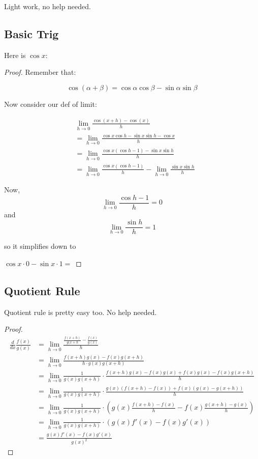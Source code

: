 Light work, no help needed.

\subsection{Basic Trig}

Here is $\cos x$:
\begin{proof}
Remember that:

\[\cos(\alpha + \beta) = \cos\alpha\cos\beta - \sin\alpha\sin\beta\]

Now consider our def of limit:

\begin{align}
&\lim_{h \to 0} \frac{\cos(x + h) - \cos(x)}{h} \\
&= \lim_{h \to 0} \frac{\cos x \cos h - \sin x \sin h - \cos x}{h} \\
&= \lim_{h \to 0} \frac{\cos x(\cos h - 1) - \sin x \sin h}{h} \\ 
&= \lim_{h \to 0} \frac{\cos x(\cos h - 1)}{h} - \lim_{h \to 0} \frac{\sin x \sin h}{h}
\end{align}

Now, 
\[\lim_{h \to 0} \frac{\cos h - 1}{h} = 0\]
and
\[\lim_{h \to 0} \frac{\sin h}{h} = 1\]

so it simplifies down to

$\cos x \cdot 0 - \sin x \cdot 1 =$ 
\end{proof}

\subsection{Quotient Rule}


Quotient rule is pretty easy too. No help needed.
\begin{proof}
\begin{align}
\frac{d}{dx} \frac{f(x)}{g(x)}
&= \lim_{h \to 0} \frac{\frac{f(x + h)}{g(x + h} - \frac{f(x)}{g(x)}}{h} \\
&= \lim_{h \to 0} \frac{f(x + h)g(x) - f(x)g(x + h)}{h \cdot g(x)g(x + h)} \\
&= \lim_{h \to 0} \frac{1}{g(x)g(x + h)} \cdot \frac{f(x + h)g(x) - f(x)g(x) + f(x)g(x) - f(x)g(x + h)}{h} \\ 
&= \lim_{h \to 0} \frac{1}{g(x)g(x + h)} \cdot \frac{g(x)(f(x + h) - f(x)) + f(x)(g(x) - g(x + h))}{h} \\
&= \lim_{h \to 0} \frac{1}{g(x)g(x + h)} \cdot (g(x) \frac{f(x + h) - f(x)}{h} - f(x) \frac{g(x + h) - g(x)}{h})\\
&= \lim_{h \to 0} \frac{1}{g(x)g(x + h)} \cdot (g(x) f'(x) - f(x) g'(x))\\
&= \frac{g(x) f'(x) - f(x) g'(x)}{g(x)^2}
\end{align}
\end{proof}


